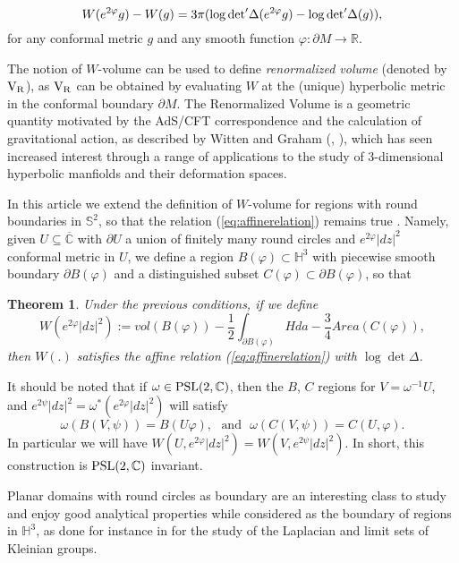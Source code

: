 \documentclass[12pt]{amsart}
\newcommand{\VR}{{\rm V}_{\rm R}}
\newtheorem{maintheorem}{Theorem}[section]
\begin{document}
\begin{equation}\label{eq:affinerelation}
W(e^{2\varphi}g) - W(g) = 3\pi (\log{\rm det}'\Delta(e^{2\varphi}g) - \log{\rm det}'\Delta(g)),
\end{equation}
for any conformal metric $g$ and any smooth function $\varphi:\partial M \rightarrow \mathbb{R}$.

The notion of $W$-volume can be used to define {\em renormalized volume} (denoted by $\VR$), as $\VR$ can be obtained by evaluating $W$ at the (unique) hyperbolic metric in the conformal boundary $\partial M$.  The Renormalized Volume is a geometric quantity motivated by the AdS/CFT correspondence and the calculation of gravitational action, as described by Witten and Graham (\cite{Witten98}, \cite{Graham}), which has seen increased interest through a range of applications to the study of 3-dimensional hyperbolic manfiolds and their deformation spaces.

In this article we extend the definition of $W$-volume for regions with round boundaries in $\mathbb{S}^2$, so that the relation (\ref{eq:affinerelation}) remains true . Namely, given $U\subseteq \overline{\mathbb{C}}$ with $\partial U$ a union of finitely many round circles and $e^{2\varphi}|dz|^2$ conformal metric in $U$, we define a region $B(\varphi)\subset \mathbb{H}^3$ with piecewise smooth boundary $\partial B(\varphi)$ and a distinguished subset $C(\varphi)\subset \partial B(\varphi)$, so that

\begin{maintheorem}\label{thm:main}
Under the previous conditions, if we define
\[
    W(e^{2\varphi}|dz|^2) := vol(B(\varphi)) - \frac12 \int_{\partial B(\varphi)} Hda - \frac34 Area(C(\varphi)),
\]
then $W(.)$ satisfies the affine relation (\ref{eq:affinerelation}) with $\log\det\Delta$.
\end{maintheorem}

It should be noted that if $\omega\in {\rm PSL}(2,\mathbb{C})$, then the $B$, $C$ regions for $V=\omega^{-1}U$, and $e^{2\psi}|dz|^2 = \omega^*(e^{2\varphi}|dz|^2)$ will satisfy $$\omega(B(V,\psi)) = B(U\varphi), \ \ \ \text{and} \ \ \ \omega(C(V,\psi)) = C(U,\varphi).$$ In particular we will have $W(U, e^{2\varphi}|dz|^2) = W(V, e^{2\psi}|dz|^2)$. In short, this construction is ${\rm PSL}(2,\mathbb{C})$ invariant.

Planar domains with round circles as boundary are an interesting class to study and enjoy good analytical properties while considered as the boundary of regions in $\mathbb{H}^3$, as done for instance in \cite{PhillipsSarnak85} for the study of the Laplacian and limit sets of Kleinian groups.  
\end{document}
